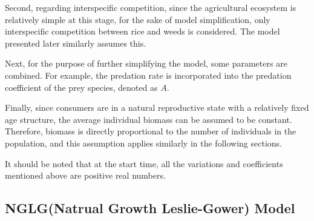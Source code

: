 \documentclass{HZNUMCM}
\begin{document}
      Second, regarding interspecific competition, since the agricultural ecosystem is relatively simple at this stage, 
      for the sake of model simplification, only interspecific competition between rice and weeds is considered. 
      The model presented later similarly assumes this.

      Next, for the purpose of further simplifying the model, some parameters are combined. 
      For example, the predation rate is incorporated into the predation coefficient of the prey species, denoted as \(A\).
      
      Finally, since consumers are in a natural reproductive state with a relatively fixed age structure, the average individual biomass can be assumed to be constant. Therefore, biomass is directly proportional to the number of individuals in the population, and this assumption applies similarly in the following sections.
      
      It should be noted that at the start time, all the variations and coefficients mentioned above are positive real numbers.
      \subsection{NGLG(Natrual Growth Leslie-Gower) Model}
\end{document}
